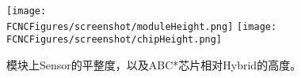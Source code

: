 \begin{figure}[H]
\centering
\texttt{[image: \\FCNCFigures/screenshot/moduleHeight.png]}
\texttt{[image: \\FCNCFigures/screenshot/chipHeight.png]}
\caption{模块上Sensor的平整度，以及ABC*芯片相对Hybrid的高度。}
\label{fig:chipHeight}
\end{figure}